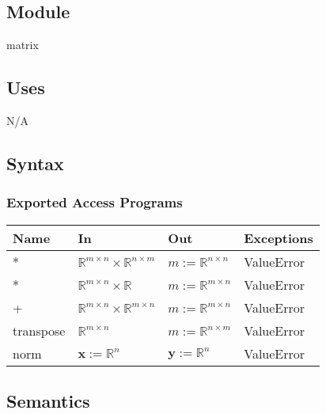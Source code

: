 \documentclass[12pt, titlepage]{article}
\begin{document}
\subsection{Module}
matrix

\subsection{Uses}
N/A

\subsection{Syntax}

\subsubsection{Exported Access Programs}

\begin{center}
\begin{tabular}{p{2cm} p{3cm} p{2.5cm} p{4.5cm}}
\hline
\textbf{Name} & \textbf{In} & \textbf{Out} & \textbf{Exceptions} \\
\hline
* & $\mathbb{R}^{m \times n} \times \mathbb{R}^{n \times m}$ & $m:=\mathbb{R}^{n \times n}$ &
ValueError \\
* & $\mathbb{R}^{m \times n} \times \mathbb{R}$ & $m:=\mathbb{R}^{m \times n}$ &
ValueError \\
+ & $\mathbb{R}^{m \times n} \times \mathbb{R}^{m \times n}$ & $m:=\mathbb{R}^{m \times n}$ &
ValueError \\
transpose & $\mathbb{R}^{m \times n}$ & $m:=\mathbb{R}^{n \times m}$ & ValueError
\\
norm & $\mathbf{x}:=\mathbb{R}^n$ & $\mathbf{y}:=\mathbb{R}^n$ & ValueError\\
\hline
\end{tabular}
\end{center}

\subsection{Semantics}

\end{document}
